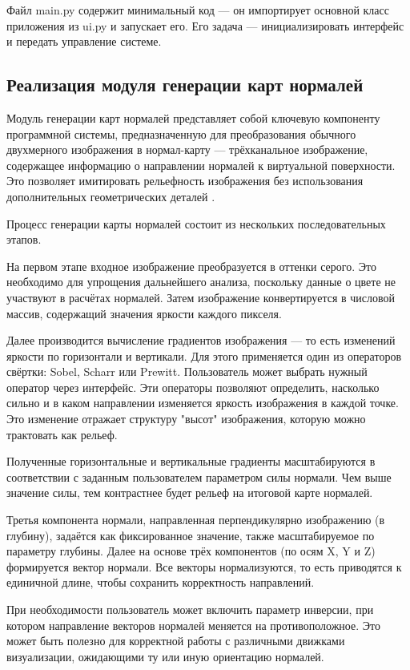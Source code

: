 Файл main.py содержит минимальный код — он импортирует основной класс приложения из ui.py и запускает его. Его задача — инициализировать интерфейс и передать управление системе.
\subsection{Реализация модуля генерации карт нормалей}

Модуль генерации карт нормалей представляет собой ключевую компоненту программной системы, предназначенную для преобразования обычного двухмерного изображения в нормал-карту — трёхканальное изображение, содержащее информацию о направлении нормалей к виртуальной поверхности. Это позволяет имитировать рельефность изображения без использования дополнительных геометрических деталей \cite{russ2020}.

Процесс генерации карты нормалей состоит из нескольких последовательных этапов.

На первом этапе входное изображение преобразуется в оттенки серого. Это необходимо для упрощения дальнейшего анализа, поскольку данные о цвете не участвуют в расчётах нормалей. Затем изображение конвертируется в числовой массив, содержащий значения яркости каждого пикселя.

Далее производится вычисление градиентов изображения — то есть изменений яркости по горизонтали и вертикали. Для этого применяется один из операторов свёртки: Sobel, Scharr или Prewitt. Пользователь может выбрать нужный оператор через интерфейс. Эти операторы позволяют определить, насколько сильно и в каком направлении изменяется яркость изображения в каждой точке. Это изменение отражает структуру "высот" изображения, которую можно трактовать как рельеф.

Полученные горизонтальные и вертикальные градиенты масштабируются в соответствии с заданным пользователем параметром силы нормали. Чем выше значение силы, тем контрастнее будет рельеф на итоговой карте нормалей.

Третья компонента нормали, направленная перпендикулярно изображению (в глубину), задаётся как фиксированное значение, также масштабируемое по параметру глубины. Далее на основе трёх компонентов (по осям X, Y и Z) формируется вектор нормали. Все векторы нормализуются, то есть приводятся к единичной длине, чтобы сохранить корректность направлений.

При необходимости пользователь может включить параметр инверсии, при котором направление векторов нормалей меняется на противоположное. Это может быть полезно для корректной работы с различными движками визуализации, ожидающими ту или иную ориентацию нормалей.

